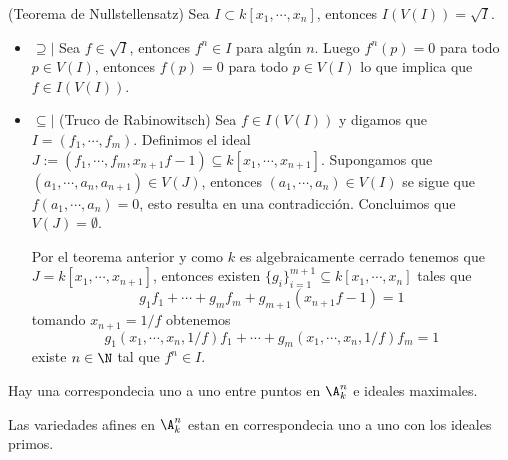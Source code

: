 \documentclass{article}
\begin{document}
\begin{teo}
    (Teorema de Nullstellensatz) Sea $I\subset k[x_{1},\cdots,x_{n}]$, entonces $I(V(I))=\sqrt{I}$.
\end{teo}

\begin{dem} \hspace{4mm}
    \begin{itemize}
        \item $\supseteq|$ Sea $f\in\sqrt{I}$, entonces $f^{n}\in I$ para algún $n$. Luego 
        $f^{n}(p)=0$ para todo $p\in V(I)$, entonces $f(p)=0$ para todo $p\in V(I)$ lo que implica
        que $f\in I(V(I))$.

        \item $\subseteq|$ (Truco de Rabinowitsch) Sea $f\in I(V(I))$ y digamos que 
        $I=(f_{1},\cdots,f_{m})$. Definimos el ideal $J:=(f_{1},\cdots,f_{m},x_{n+1}f-1)
        \subseteq k[x_{1},\cdots,x_{n+1}]$. Supongamos que $(a_{1},\cdots,a_{n},a_{n+1})\in V(J)$,
        entonces $(a_{1},\cdots,a_{n})\in V(I)$ se sigue que $f(a_{1},\cdots,a_{n})=0$, esto 
        resulta en una contradicción. Concluimos que $V(J)=\emptyset$.
        \vspace{4mm}

        \noindent Por el teorema anterior y como $k$ es algebraicamente cerrado tenemos que 
        $J=k[x_{1},\cdots,x_{n+1}]$, entonces existen $\{g_{i}\}_{i=1}^{m+1}\subseteq 
        k[x_{1},\cdots,x_{n}]$ tales que
        \begin{equation*}
            g_{1}f_{1}+\cdots+g_{m}f_{m}+g_{m+1}(x_{n+1}f-1)=1
        \end{equation*}
        tomando $x_{n+1}=1/f$ obtenemos
        \begin{equation*}
            g_{1}(x_{1},\cdots,x_{n},1/f)f_{1}+\cdots+g_{m}(x_{1},\cdots,x_{n},1/f)f_{m}=1
        \end{equation*}
        existe $n\in\N$ tal que $f^{n}\in I$.
    \end{itemize}
\end{dem}

\begin{cor}
    Hay una correspondecia uno a uno entre puntos en $\A_{k}^{n}$ e ideales maximales.
\end{cor}

\begin{cor}
    Las variedades afines en $\A_{k}^{n}$ estan en correspondecia uno a uno con los ideales primos.
\end{cor}
\end{document}
